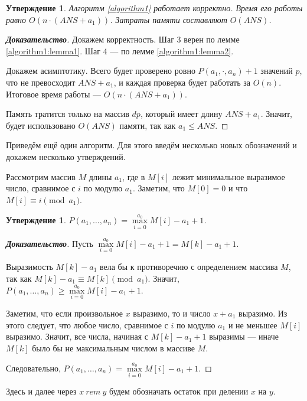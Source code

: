 \documentclass[12pt]{article}
\newtheorem{proposition}[theorem]{Утверждение}
\begin{document}
\begin{proposition}
Алгоритм \ref{algorithm1} работает корректно. Время его работы равно $O(n \cdot (ANS + a_1))$. Затраты памяти составляют $O(ANS)$.
\end{proposition}
\begin{proof}[\textbf{Доказательство}]
Докажем корректность. Шаг 3 верен по лемме \ref{algorithm1:lemma1}. Шаг 4 --- по лемме \ref{algorithm1:lemma2}.

Докажем асимптотику. Всего будет проверено ровно $P(a_1, \cdot, a_n) + 1$ значений $p$, что не превосходит $ANS + a_1$, и каждая проверка будет работать за $O(n)$. Итоговое время работы --- $O(n \cdot (ANS + a_1))$.

Память тратится только на массив $dp$, который имеет длину $ANS + a_1$. Значит, будет использовано $O(ANS)$ памяти, так как $a_1 \le ANS$.
\end{proof}

Приведём ещё один алгоритм. Для этого введём несколько новых обозначений и докажем несколько утверждений.

Рассмотрим массив $M$ длины $a_1$, где в $M[i]$ лежит минимальное выразимое число, сравнимое с $i$ по модулю $a_1$. Заметим, что $M[0] = 0$ и что $M[i] \equiv i \pmod {a_1}$.

\begin{proposition}
\label{algorithm2:lemma1}
$P(a_1, \dots, a_n) = \max\limits_{i = 0}^{a_0} M[i] - a_1 + 1$.
\end{proposition}
\begin{proof}[\textbf{Доказательство}]
Пусть $\max\limits_{i = 0}^{a_0} M[i] - a_1 + 1 = M[k] - a_1 + 1$.

Выразимость $M[k] - a_1$ вела бы к противоречию с определением массива $M$, так как $M[k] - a_1 \equiv M[k] \pmod {a_1}$. Значит, $P(a_1, \dots, a_n) \ge \max\limits_{i = 0}^{a_0} M[i] - a_1 + 1$.

Заметим, что если произвольное $x$ выразимо, то и число $x + a_1$ выразимо. Из этого следует, что любое число, сравнимое с $i$ по модулю $a_1$ и не меньшее $M[i]$ выразимо. Значит, все числа, начиная с $M[k] - a_1 + 1$ выразимы --- иначе $M[k]$ было бы не максимальным числом в массиве $M$.

Следовательно, $P(a_1, \dots, a_n) = \max\limits_{i = 0}^{a_0} M[i] - a_1 + 1$.
\end{proof}

Здесь и далее через $x \ rem \ y$ будем обозначать  остаток при делении $x$ на $y$.
\end{document}

